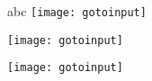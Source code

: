 \documentclass{article}
\begin{document}
abc
\texttt{[image: gotoinput]}

\texttt{[image: gotoinput]}

\texttt{[image: gotoinput]}
\end{document}
